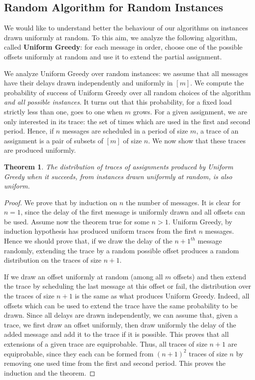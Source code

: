 \documentclass[10pt, conference, letterpaper]{IEEEtran}
\newtheorem{theorem}{Theorem}
\begin{document}
\subsection{Random Algorithm for Random Instances}

We would like to understand better the behaviour of our algorithms
on instances drawn uniformly at random. To this aim, we analyze the following algorithm, called \textbf{Uniform Greedy}: for each message in order, choose one of the possible offsets uniformly at random and use it to extend the partial assignment. 

We analyze Uniform Greedy over random instances: we assume that all messages have 
their delays drawn independently and uniformly in $[m]$. We compute the probability of success of Uniform Greedy over all random choices of the algorithm \emph{and all possible instances}. 
It turns out that this probability, for a fixed load strictly less than one, goes to one when $m$ grows. 
For a given assignment, we are only interested in its trace: the set of times which are used in the first and second period. Hence, if $n$ messages are scheduled in a period of size $m$, a trace of an assignment is a pair of subsets of $[m]$ of size $n$. We now show that these traces are produced uniformly.

\begin{theorem}
The distribution of traces of assignments produced by Uniform Greedy when it succeeds, from instances drawn uniformly at random, is also uniform.
\end{theorem}
\begin{proof}
We prove that by induction on $n$ the number of messages. It is clear for $n=1$,
since the delay of the first message is uniformly drawn and all offsets can be used.
Assume now the theorem true for some $n>1$. Uniform Greedy, by induction hypothesis has produced
uniform traces from the first $n$ messages.  Hence we should prove that, if we draw the delay
of the $n+1^{th}$ message randomly, extending the trace by a random possible offset produces a random distribution on the traces of size $n+1$. 

 If we draw an offset uniformly at random (among all $m$ offsets) and then extend the trace by scheduling the last message at this offset or fail, the distribution over the traces of size $n+1$ is the same as what produces Uniform Greedy. Indeed, all offsets which can be used to extend the trace have the same probability to be drawn. Since all delays are drawn independently, we can assume that, given a trace, we first draw an offset uniformly, then draw uniformly the delay of the added message and add it to the trace if it is possible. This proves that all extensions of a given trace are equiprobable. Thus, all traces of size $n+1$ are equiprobable, since they each can be formed from $(n+1)^2$ traces of size $n$ by removing one used time from the first and second period. This proves the induction and the theorem.
\end{proof}
\end{document}

